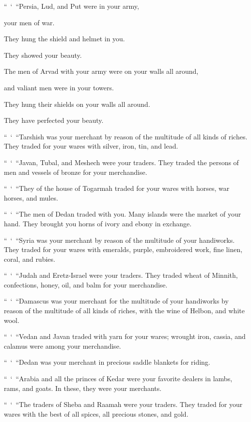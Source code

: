 \vspace{\baselineskip} \myverse{}“ ‘ “Persia, Lud, and Put were in your army,

your men of war.

They hung the shield and helmet in you.

They showed your beauty.

\myverse{}The men of Arvad with your army were on your walls all around,

and valiant men were in your towers.

They hung their shields on your walls all around.

They have perfected your beauty.

\myverse{}“ ‘ “Tarshish was your merchant by reason of the multitude of
all kinds of riches. They traded for your wares with silver, iron, tin, and lead.

\myverse{}“ ‘ “Javan, Tubal, and Meshech were your traders. They traded
the persons of men and vessels of bronze for your merchandise.

\myverse{}“ ‘ “They of the house of Togarmah traded for your wares with
horses, war horses, and mules.

\myverse{}“ ‘ “The men of Dedan traded with you. Many islands were the market
of your hand. They brought you horns of ivory and ebony in exchange.

\myverse{}“ ‘ “Syria was your merchant by reason of the multitude of your
handiworks. They traded for your wares with emeralds, purple, embroidered work, fine linen, coral, and
rubies.

\myverse{}“ ‘ “Judah and Eretz-Israel were your traders. They traded wheat
of Minnith, confections, honey, oil, and balm for your merchandise.

\myverse{}“ ‘ “Damascus was your merchant for the multitude of your handiworks
by reason of the multitude of all kinds of riches, with the wine of Helbon, and white wool.

\myverse{}“ ‘ “Vedan and Javan traded with yarn for your wares; wrought
iron, cassia, and calamus were among your merchandise.

\myverse{}“ ‘ “Dedan was your merchant in precious saddle blankets for riding.

\myverse{}“ ‘ “Arabia and all the princes of Kedar were your favorite dealers
in lambs, rams, and goats. In these, they were your merchants.

\myverse{}“ ‘ “The traders of Sheba and Raamah were your traders. They traded
for your wares with the best of all spices, all precious stones, and gold.

